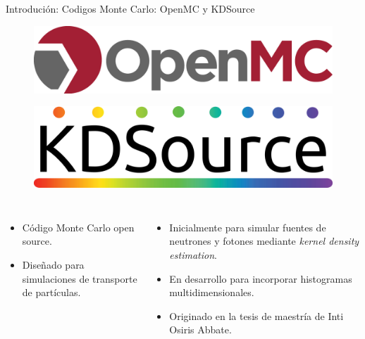 \documentclass[aspectratio=169,english]{beamer}
\begin{document}
\begin{frame}{Introdución: Codigos Monte Carlo: OpenMC y KDSource}
    \begin{figure}
        \centering
        \begin{minipage}{0.35\textwidth}
            \centering
            \includegraphics[width=\linewidth]{imagens/openmc.png}
            \label{fig:openmc}
        \end{minipage}\hfill
        \begin{minipage}{0.35\textwidth}
            \centering
            \includegraphics[width=\linewidth]{imagens/esquema3.png}
            \label{fig:esquema3}
        \end{minipage}
    \end{figure}

    \begin{columns}[t]
            \begin{itemize}
                \item Código Monte Carlo open source.
                \item Diseñado para simulaciones de transporte de partículas.
            \end{itemize}
            \begin{itemize}
                \item Inicialmente para simular fuentes de neutrones y fotones mediante \textit{kernel density estimation}.
                \item En desarrollo para incorporar histogramas multidimensionales.
                \item Originado en la tesis de maestría de Inti Osiris Abbate.
            \end{itemize}
    \end{columns}
\end{frame}
\end{document}
